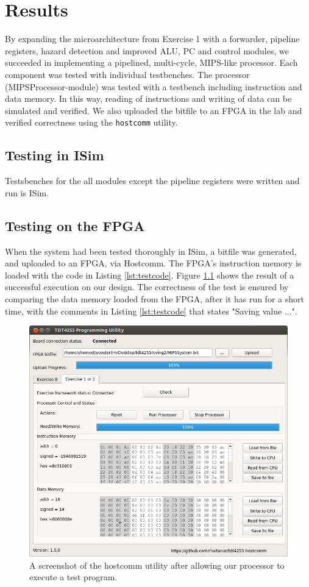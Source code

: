 \chapter{Results}

By expanding the microarchitecture from Exercise 1 \cite{compendium} with a forwarder, pipeline registers, hazard detection and improved ALU, PC and control modules, we succeeded in implementing a pipelined, multi-cycle, MIPS-like processor.
Each component was tested with individual testbenches.
The processor (MIPSProcessor-module) was tested with a testbench including instruction and data memory.
In this way, reading of instructions and writing of data can be simulated and verified.
We also uploaded the bitfile to an FPGA in the lab and verified correctness using the \texttt{hostcomm} utility.

\section{Testing in ISim}
Testsbenches for the all modules except the pipeline registers were written and run is ISim. 

\section{Testing on the FPGA}
When the system had been tested thoroughly in ISim, a bitfile was generated, and uploaded to an FPGA, via Hostcomm. The FPGA's instruction memory is loaded with the code in Listing \ref{lst:testcode}. Figure \ref{fig:hostcomm} shows the result of a successful execution on our design. The correctness of the test is ensured by comparing the data memory loaded from the FPGA, after it has run for a short time, with the comments in Listing \ref{lst:testcode} that states "Saving value ...".

\begin{figure}[h!]
    \includegraphics[width=\linewidth]{img/hostcomm_result.png}
    \caption{A screenshot of the hostcomm utility after allowing our processor to execute a test program.}
    \label{fig:hostcomm}
\end{figure}


